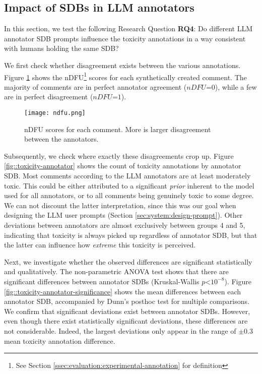 \subsection{Impact of SDBs in LLM annotators}
\label{ssec:evaluation:annotators}

In this section, we test the following Research Question \textbf{RQ4}: Do different LLM annotator \ac{SDB} prompts influence the toxicity annotations in a way consistent with humans holding the same \ac{SDB}? 

We first check whether disagreement exists between the various annotations. Figure \ref{fig::toxicity-ndfu} shows the  \ac{nDFU}\footnote{See Section \ref{ssec:evaluation:experimental-annotation} for definition} scores for each synthetically created comment. The majority of comments are in perfect annotator agreement ($nDFU\text{=}0$), while a few are in perfect disagreement ($nDFU\text{=}1$).

\begin{figure}
	\centering
	\texttt{[image: ndfu.png]}
	\caption{\ac{nDFU} \cite{pavlopoulos-likas-2024-polarized} scores for each comment. More is larger disagreement between the annotators.}
	\label{fig::toxicity-ndfu}
\end{figure}

Subsequently, we check where exactly these disagreements crop up. Figure \ref{fig::toxicity-annotator} shows the count of toxicity annotations by annotator \ac{SDB}. Most comments according to the LLM annotators are at least moderately toxic. This could be either attributed to a significant \textit{prior} inherent to the model used for all annotators, or to all comments being genuinely toxic to some degree. We can not discount the latter interpretation, since this was our goal when designing the LLM user prompts (Section \ref{sec:system:design-prompt}). Other deviations between annotators are almost exclusively between groups 4 and 5, indicating that toxicity is always picked up regardless of annotator \ac{SDB}, but that the latter can influence how \textit{extreme} this toxicity is perceived.

Next, we investigate whether the observed differences are significant statistically and qualitatively. The non-parametric ANOVA test shows that there are significant differences between annotator \acp{SDB} (Kruskal-Wallis $p\text{<}10^{-8}$). Figure \ref{fig::toxicity-annotator-significance} shows the mean differences between each annotator \ac{SDB}, accompanied by Dunn's posthoc test for multiple comparisons. We confirm that significant deviations exist between annotator \acp{SDB}. However, even though there exist statistically significant deviations, these differences are not considerable. Indeed, the largest deviations only appear in the range of $\pm 0.3$ mean toxicity annotation difference.

